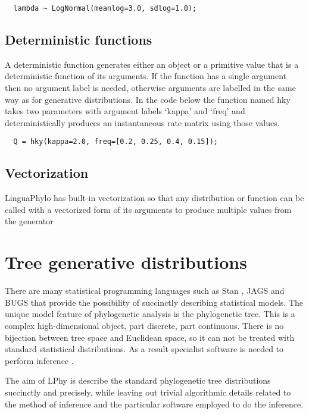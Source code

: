 \documentclass[oneside]{article}
\begin{document}
{\singlespacing
\begin{verbatim}
  lambda ~ LogNormal(meanlog=3.0, sdlog=1.0);
\end{verbatim}
}

\subsection{Deterministic functions}

A deterministic function generates either an object or a primitive value that is a deterministic function of its arguments. If the function has a single argument then no argument label is needed, otherwise arguments are labelled in the same way as for generative distributions. In the code below the function named hky takes two parameters with argument labels `kappa' and `freq' and deterministically produces an instantaneous rate matrix using those values.

{\singlespacing
\begin{verbatim}
  Q = hky(kappa=2.0, freq=[0.2, 0.25, 0.4, 0.15]);
\end{verbatim}
}

\subsection{Vectorization}

LinguaPhylo has built-in vectorization so that any distribution or function can be called with a vectorized form of its arguments to produce multiple values from the generator

\section{Tree generative distributions}

There are many statistical programming languages such as Stan
\cite{carpenter2017stan}, JAGS \cite{plummer2003jags} and BUGS \cite{lunn2009bugs, gilks1994language} that provide the possibility
of succinctly describing statistical models. The unique model feature of
phylogenetic analysis is the phylogenetic tree.
This is a complex high-dimensional object, part discrete, part
continuous.
There is no bijection between tree space and Euclidean space, so it
can not be treated with standard statistical distributions.
As a result specialist software is needed to perform inference \cite{hohna2016revbayes,bouckaert2019beastanalysis}.

The aim of LPhy is describe the standard phylogenetic tree
distributions succinctly and precisely, while leaving out trivial algorithmic details related to the method
of inference and the particular software employed to do the inference.
\end{document}
